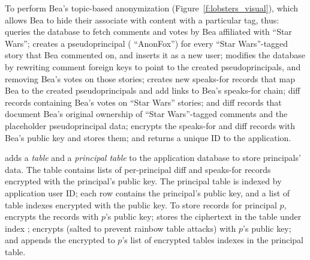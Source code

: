%
To perform Bea's topic-based anonymization (Figure~\ref{f:lobsters_visual}),
which allows Bea to hide their associate with content with a particular tag,
%
\sys thus:
%
\one{} queries the database to fetch comments and votes by Bea
affiliated with ``Star Wars'';
%
\two{} creates a pseudoprincipal (\eg
``AnonFox'') for every ``Star Wars''-tagged story that Bea commented
on, and inserts it as a new user;
%
\three{} modifies the database by rewriting comment
foreign keys to point to the created pseudoprincipals, and
removing Bea's votes on those stories;
%
\four{} creates new speaks-for records that map Bea to the created
pseudoprincipals and add links to Bea's speaks-for chain; diff records
containing Bea's votes on ``Star Wars'' stories; and diff records that document
Bea's original ownership of ``Star Wars''-tagged comments and the placeholder
pseudoprincipal data;
%
\five{} encrypts the speaks-for and diff records with Bea's public key and stores
them; and
%
\six{} returns a unique \xx ID to the application.

%
%
%

\sys adds a \emph{\xx table} and a \emph{principal table} to the application
database to store principals' \xxed data.
%
The \xx table contains lists of per-principal diff and speaks-for records encrypted with the
principal's public key.
%
%
The principal table is indexed by application user ID; each row contains the
principal's public key, and a list of \xx table indexes encrypted with the
public key.
%
To store records for principal $p$, \sys \one{} encrypts the records with
$p$'s public key; \two{} stores the ciphertext in the \xx table under index
; \three{} encrypts  (salted to
prevent rainbow table attacks) with $p$'s public key; and \four{} appends the
encrypted  to $p$'s list of encrypted \xx tables indexes
in the principal table.

